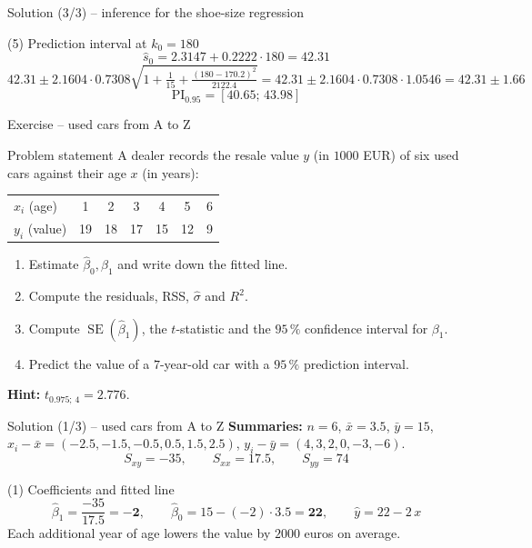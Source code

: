 \documentclass[aspectratio=169,11pt]{beamer}
\begin{document}
\begin{frame}{Solution (3/3) -- inference for the shoe-size regression}
  \begin{exampleblock}{(5) Prediction interval at $k_0=180$}
    \[
      \hat s_0=2.3147+0.2222\cdot180=42.31
    \]
    \[
      42.31\pm2.1604\cdot0.7308\sqrt{1+\tfrac1{15}+\tfrac{(180-170.2)^2}{2122.4}}
      =42.31\pm2.1604\cdot0.7308\cdot1.0546
      =42.31\pm1.66
    \]
    \[
      \text{PI}_{0.95}=\mathbf{[40.65;\,43.98]}
    \]
  \end{exampleblock}
\end{frame}

\begin{frame}{Exercise -- used cars from A to Z}
  \begin{block}{Problem statement}
    A dealer records the resale value $y$ (in $1000$ EUR) of six used cars
    against their age $x$ (in years):
    \begin{center}
      \begin{tabular}{l|cccccc}
        \toprule
        $x_i$ (age) & 1 & 2 & 3 & 4 & 5 & 6\\
        $y_i$ (value) & 19 & 18 & 17 & 15 & 12 & 9\\
        \bottomrule
      \end{tabular}
    \end{center}
    \begin{enumerate}
      \item Estimate $\hat\beta_0,\hat\beta_1$ and write down the fitted line.
      \item Compute the residuals, RSS, $\hat\sigma$ and $R^2$.
      \item Compute $\operatorname{SE}(\hat\beta_1)$, the $t$-statistic and the
            $95\,\%$ confidence interval for $\beta_1$.
      \item Predict the value of a $7$-year-old car with a $95\,\%$
            prediction interval.
    \end{enumerate}
  \end{block}
  \textbf{Hint:} $t_{0.975;\,4}=2.776$.
\end{frame}

\begin{frame}{Solution (1/3) -- used cars from A to Z}
  \textbf{Summaries:} $n=6$, $\bar x=3.5$, $\bar y=15$,
  $x_i-\bar x=(-2.5,-1.5,-0.5,0.5,1.5,2.5)$,
  $y_i-\bar y=(4,3,2,0,-3,-6)$.
  \[
    S_{xy}=-35,\qquad S_{xx}=17.5,\qquad S_{yy}=74
  \]
  \begin{exampleblock}{(1) Coefficients and fitted line}
    \[
      \hat\beta_1=\frac{-35}{17.5}=\mathbf{-2},\qquad
      \hat\beta_0=15-(-2)\cdot3.5=\mathbf{22},\qquad
      \hat y=22-2\,x
    \]
    Each additional year of age lowers the value by $2000$ euros on average.
  \end{exampleblock}
\end{frame}
\end{document}

